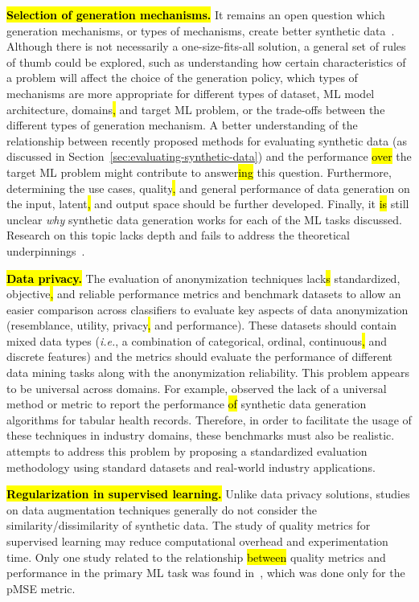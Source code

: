 \hl{\textbf{Selection of generation mechanisms.}} It remains an open question
which generation mechanisms, or types of
mechanisms, create better synthetic data~\cite{cheung2020modals}. Although
there is not necessarily a one-size-fits-all solution, a general set of rules
of thumb could be explored, such as understanding how certain characteristics
of a problem will affect the choice of the generation policy, which types of
mechanisms are more appropriate for different types of dataset, ML model
architecture, domains\hl{,} and target ML problem, or the trade-offs between the
different types of generation mechanism. A better understanding of the
relationship between recently proposed methods for evaluating synthetic data
(as discussed in Section~\ref{sec:evaluating-synthetic-data}) and the
performance \hl{over} the target ML problem might contribute to answer\hl{ing} this question.
Furthermore, determining the use cases, quality\hl{,} and general performance of
data generation on the input, latent\hl{,} and output space should be further
developed. Finally, it \hl{is} still unclear \textit{why} synthetic data generation
works for each of the ML tasks discussed. Research on this topic lacks depth
and fails to address the theoretical underpinnings~\cite{feng2021survey,
dao2019kernel}.

\hl{\textbf{Data privacy.} }The evaluation of anonymization techniques lack\hl{s} standardized,
objective\hl{,} and
reliable performance metrics and benchmark datasets to allow an easier
comparison across classifiers to evaluate key aspects of data anonymization
(resemblance, utility, privacy\hl{,} and performance). These datasets should contain
mixed data types (\textit{i.e.}, a combination of categorical, ordinal,
continuous\hl{,} and discrete features) and the metrics should evaluate the
performance of different data mining tasks along with the anonymization
reliability. This problem appears to be universal across domains. For example,
\cite{hernandez2022synthetic} observed the lack of a universal method or
metric to report the performance \hl{of} synthetic data generation algorithms for
tabular health records. Therefore, in order to facilitate the usage of these
techniques in industry domains, these benchmarks must also be
realistic. \cite{rosenblatt2020differentially} attempts to address this
problem by proposing a standardized evaluation methodology using standard
datasets and real-world industry applications.

\hl{\textbf{Regularization in supervised learning. }}Unlike data privacy
solutions, studies on data augmentation techniques generally do not consider
the similarity/dissimilarity of synthetic data. The study of quality metrics
for supervised learning may reduce computational overhead and experimentation
time. Only one study related to the relationship \hl{between} quality metrics
and performance in the primary ML task was found in~\cite{dankar2021fake},
which was done only for the pMSE metric.

